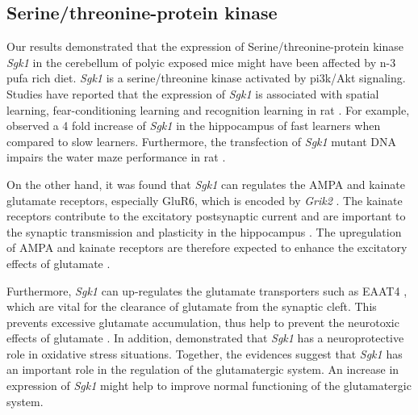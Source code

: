 \documentclass[12pt]{scrbook}
\begin{document}
\subsection{Serine/threonine-protein kinase}
Our results demonstrated that the expression of Serine/threonine-protein kinase \textit{Sgk1} in the cerebellum of \gls{polyic} exposed mice might have been affected by n-3 \gls{pufa} rich diet.
\textit{Sgk1} is a serine/threonine kinase activated by \gls{pi3k}/Akt signaling.
Studies have reported that the expression of \textit{Sgk1} is associated with spatial learning, fear-conditioning learning and recognition learning in rat \citep{Tsai2002,Lee2003}.
For example, \citet{Tsai2002} observed a 4 fold increase of \textit{Sgk1} in the hippocampus of fast learners when compared to slow learners.
Furthermore, the transfection of \textit{Sgk1} mutant DNA impairs the water maze performance in rat \citep{Tsai2002}.

On the other hand, it was found that \textit{Sgk1} can regulates the AMPA and kainate glutamate receptors, especially GluR6, which is encoded by \textit{Grik2} \citep{Lang2006,Lang2010}.
The kainate receptors contribute to the excitatory postsynaptic current and are important to the synaptic transmission and plasticity in the hippocampus \citep{Lang2006}.
The upregulation of AMPA and kainate receptors are therefore expected to enhance the excitatory effects of glutamate \citep{Lang2010}.

Furthermore, \textit{Sgk1} can up-regulates the glutamate transporters such as EAAT4 \citep{Bohmer2004}, which are vital for the clearance of glutamate from the synaptic cleft.
This prevents excessive glutamate accumulation, thus help to prevent the neurotoxic effects of glutamate \citep{Lang2010}.
In addition, \citet{Schoenebeck2005} demonstrated that \textit{Sgk1} has a neuroprotective role in oxidative stress situations. 
Together, the evidences suggest that \textit{Sgk1} has an important role in the regulation of the glutamatergic system.
An increase in expression of \textit{Sgk1} might help to improve normal functioning of the glutamatergic system.
\end{document}
